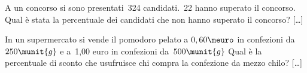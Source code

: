 \begin{htmulticols}{2}
\begin{esercizio}
\label{ese:3.189}
 A un concorso si sono presentati~324 candidati.~22 hanno superato il
concorso. Qual è stata la percentuale dei candidati che non hanno
superato il concorso? \hfill [\dots]
\end{esercizio}

% 

\begin{esercizio}
\label{ese:3.192}
In un supermercato si vende il pomodoro pelato a \(0,60\meuro\) in
confezioni da~\(250\munit{g}\) e a~1,00 euro in confezioni 
da~\(500\munit{g}\) 
Qual è la percentuale di sconto che usufruisce chi compra la confezione da 
mezzo chilo? \hfill [\dots]
\end{esercizio}


% 


\end{htmulticols}
